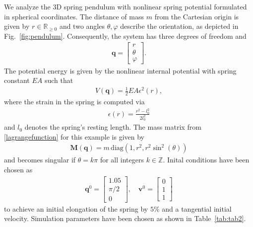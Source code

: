 \documentclass{multibody2023_full_paper}
\renewcommand{\vec}[1]{\ensuremath{\mbox{$\mathbf{#1}$}}}
\begin{document}
We analyze the 3D spring pendulum with nonlinear spring potential formulated in spherical coordinates. The distance of mass $m$ from the Cartesian origin is given by $r \in \mathbb{R}_{\geq 0}$ and two angles $\theta, \varphi$ describe the orientation, as depicted in Fig.~\ref{fig:pendulum}. Consequently, the system has three degrees of freedom and
\begin{align}
    \vec{q} = \begin{bmatrix}
                  r \\ \theta \\ \varphi
              \end{bmatrix} .
\end{align}
The potential energy is given by the nonlinear internal potential with spring constant $EA$ such that
\begin{align}
    V(\vec{q}) = \frac{1}{2} EA \epsilon^2(r) ,
\end{align}
where the strain in the spring is computed via
\begin{align}
    \epsilon(r) = \frac{r^2 - l_0^2}{2 l_0^2}
\end{align}
and $l_0$ denotes the spring's resting length. The mass matrix from \eqref{lagrangefunction} for this example is given by
\begin{align}
    \vec{M}(\vec{q}) = m \, \mathrm{diag}(1, r^2, r^2 \sin^2(\theta))
\end{align}
and becomes singular if $\theta = k \pi$ for all integers $k \in \mathbb{Z}$.
Inital conditions have been chosen as
\begin{align}
    \vec{q}^0 = \begin{bmatrix}
                    1.05 \\ \pi/2 \\
                    0
                \end{bmatrix}, \quad \vec{v}^0 = \begin{bmatrix}
                                                     0 \\ 1 \\
                                                     1
                                                 \end{bmatrix}
\end{align}
to achieve an initial elongation of the spring by $5\%$ and a tangential initial velocity. Simulation parameters have been chosen as shown in Table~\ref{tab:tab2}.
\end{document}
